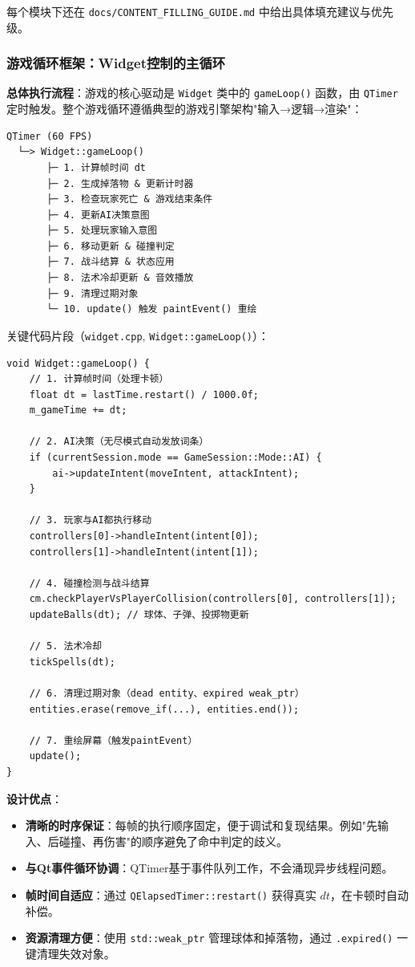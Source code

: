 ﻿\documentclass[utf8]{ctexart}
\begin{document}
每个模块下还在 \texttt{docs/CONTENT\_FILLING\_GUIDE.md} 中给出具体填充建议与优先级。

\subsubsection{游戏循环框架：Widget控制的主循环}

\textbf{总体执行流程}：游戏的核心驱动是 \texttt{Widget} 类中的 \texttt{gameLoop()} 函数，由 \texttt{QTimer} 定时触发。整个游戏循环遵循典型的游戏引擎架构"输入→逻辑→渲染"：

\begin{verbatim}
QTimer (60 FPS) 
  └─> Widget::gameLoop() 
       ├─ 1. 计算帧时间 dt
       ├─ 2. 生成掉落物 & 更新计时器
       ├─ 3. 检查玩家死亡 & 游戏结束条件
       ├─ 4. 更新AI决策意图
       ├─ 5. 处理玩家输入意图
       ├─ 6. 移动更新 & 碰撞判定
       ├─ 7. 战斗结算 & 状态应用
       ├─ 8. 法术冷却更新 & 音效播放
       ├─ 9. 清理过期对象
       └─ 10. update() 触发 paintEvent() 重绘
\end{verbatim}

关键代码片段（\texttt{widget.cpp}, \texttt{Widget::gameLoop()}）：

\begin{verbatim}
void Widget::gameLoop() {
    // 1. 计算帧时间（处理卡顿）
    float dt = lastTime.restart() / 1000.0f;
    m_gameTime += dt;
    
    // 2. AI决策（无尽模式自动发放词条）
    if (currentSession.mode == GameSession::Mode::AI) {
        ai->updateIntent(moveIntent, attackIntent);
    }
    
    // 3. 玩家与AI都执行移动
    controllers[0]->handleIntent(intent[0]);
    controllers[1]->handleIntent(intent[1]);
    
    // 4. 碰撞检测与战斗结算
    cm.checkPlayerVsPlayerCollision(controllers[0], controllers[1]);
    updateBalls(dt); // 球体、子弹、投掷物更新
    
    // 5. 法术冷却
    tickSpells(dt);
    
    // 6. 清理过期对象（dead entity、expired weak_ptr）
    entities.erase(remove_if(...), entities.end());
    
    // 7. 重绘屏幕（触发paintEvent）
    update();
}
\end{verbatim}

\textbf{设计优点}：
\begin{itemize}
  \item \textbf{清晰的时序保证}：每帧的执行顺序固定，便于调试和复现结果。例如"先输入、后碰撞、再伤害"的顺序避免了命中判定的歧义。
  \item \textbf{与Qt事件循环协调}：QTimer基于事件队列工作，不会涌现异步线程问题。
  \item \textbf{帧时间自适应}：通过 \texttt{QElapsedTimer::restart()} 获得真实 $dt$，在卡顿时自动补偿。
  \item \textbf{资源清理方便}：使用 \texttt{std::weak\_ptr} 管理球体和掉落物，通过 \texttt{.expired()} 一键清理失效对象。
\end{itemize}
\end{document}
